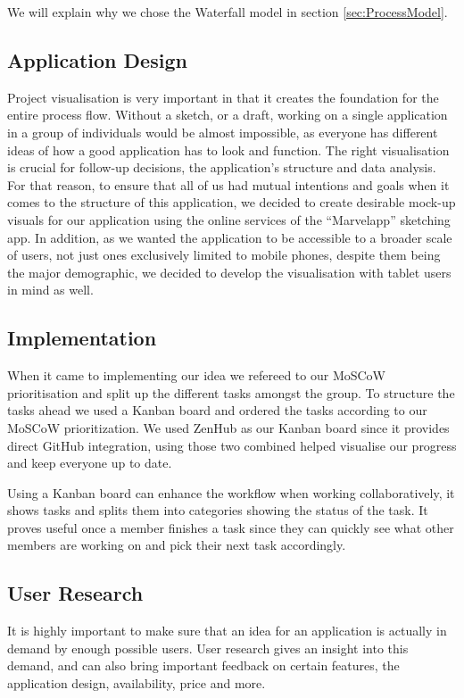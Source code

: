\documentclass[12p]{article}
\begin{document}
    We will explain why we chose the Waterfall model in section \ref{sec:ProcessModel}.
	
	\subsection{Application Design}
	Project visualisation is very important in that it creates the foundation for the entire process flow. Without a sketch, or a draft, working on a single application in a group of individuals would be almost impossible, as everyone has different ideas of how a good application has to look and function. The right visualisation is crucial for follow-up decisions, the application’s structure and data analysis. For that reason, to ensure that all of us had mutual intentions and goals when it comes to the structure of this application, we decided to create desirable mock-up visuals for our application using the online services of the “Marvelapp” sketching app. In addition, as we wanted the application to be accessible to a broader scale of users, not just ones exclusively limited to mobile phones, despite them being the major demographic, we decided to develop the visualisation with tablet users in mind as well.
	
	\subsection{Implementation}
	
	When it came to implementing our idea we refereed to our MoSCoW prioritisation and split up the different tasks amongst the group. To structure the tasks ahead we used a Kanban board and ordered the tasks according to our MoSCoW prioritization. We used ZenHub\cite{Zenhub} as our Kanban board since it provides direct GitHub integration, using those two combined helped visualise our progress and keep everyone up to date.
	
	Using a Kanban board can enhance the workflow when working collaboratively, it shows tasks and splits them into categories showing the status of the task. It proves useful once a member finishes a task since they can quickly see what other members are working on and pick their next task accordingly. 
	
	
	\subsection{User Research}
	It is highly important to make sure that an idea for an application is actually in demand by enough possible users. User research gives an insight into this demand, and can also bring important feedback on certain features, the application design, availability, price and more.
    
\end{document}
